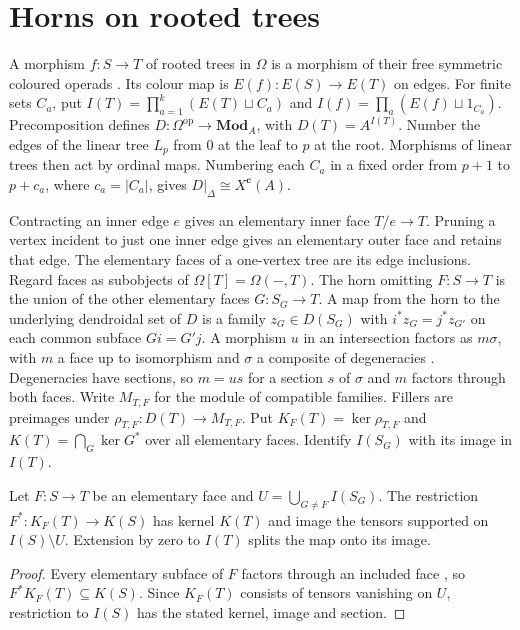 \section{Horns on rooted trees}\label{sec:tree-horns}
A morphism $f:S\to T$ of rooted trees in $\Omega$ is a morphism of their
free symmetric coloured operads \cite[\S3]{MoerdijkWeissDendroidal}.
Its colour map is $E(f):E(S)\to E(T)$ on edges. For finite sets $C_a$, put
$I(T)=\prod_{a=1}^k(E(T)\sqcup C_a)$ and $I(f)=\prod_a(E(f)\sqcup 1_{C_a})$.
Precomposition defines $D:\Omega^{\mathrm{op}}\to\mathbf{Mod}_A$, with $D(T)=A^{I(T)}$.
Number the edges of the linear tree $L_p$ from $0$ at the leaf to $p$ at the root.
Morphisms of linear trees then act by ordinal maps. Numbering each $C_a$ in a
fixed order from $p+1$ to $p+c_a$, where $c_a=|C_a|$, gives $D|_\Delta\cong X^{\mathbf c}(A)$.

Contracting an inner edge $e$ gives an elementary inner face $T/e\to T$.
Pruning a vertex incident to just one inner edge gives an elementary outer
face and retains that edge. The elementary faces of a one-vertex tree are its
edge inclusions. Regard faces as subobjects
of $\Omega[T]=\Omega(-,T)$. The horn omitting $F:S\to T$ is the union of the
other elementary faces $G:S_G\to T$. A map from the horn to the underlying
dendroidal set of $D$ is a family $z_G\in D(S_G)$ with $i^*z_G=j^*z_{G'}$
on each common subface $Gi=G'j$. A morphism $u$ in an intersection factors as
$m\sigma$, with $m$ a face up to isomorphism and $\sigma$ a composite of
degeneracies \cite[Lemma~3.1]{MoerdijkWeissDendroidal}. Degeneracies have
sections, so $m=us$ for a section $s$ of $\sigma$ and $m$ factors through both faces.
Write $M_{T,F}$ for the module of compatible families. Fillers are preimages
under $\rho_{T,F}:D(T)\to M_{T,F}$. Put $K_F(T)=\ker\rho_{T,F}$ and
$K(T)=\bigcap_G\ker G^*$ over all elementary faces. Identify $I(S_G)$
with its image in $I(T)$.

\begin{proposition}\label{prop:tree-lifts}
Let $F:S\to T$ be an elementary face and $U=\bigcup_{G\ne F} I(S_G)$.
The restriction $F^*:K_F(T)\to K(S)$ has kernel $K(T)$ and image the
tensors supported on $I(S)\setminus U$. Extension by zero to $I(T)$
splits the map onto its image.
\end{proposition}
\begin{proof}
Every elementary subface of $F$ factors through an included face
\cite[Lemma~2.1]{BasicNikolaus}, so $F^*K_F(T)\subseteq K(S)$.
Since $K_F(T)$ consists of tensors vanishing on $U$, restriction to $I(S)$
has the stated kernel, image and section.
\end{proof}

